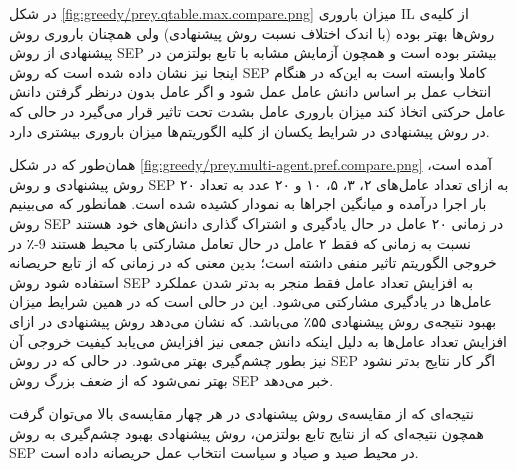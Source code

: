 
در شکل
\ref{fig:greedy/prey.qtable.max.compare.png}
میزان باروری IL از کلیه‌ی روش‌ها بهتر بوده (با اندک اختلاف نسبت روش پیشنهادی) ولی همچنان باروری روش پیشنهادی از روش SEP بیشتر بوده است و همچون آزمایش مشابه با تابع بولتزمن در اینجا نیز نشان داده شده است که روش SEP کاملا وابسته است به این‌که در هنگام انتخاب عمل بر اساس دانش عامل عمل شود و اگر عامل بدون درنظر گرفتن دانش عامل حرکتی اتخاذ کند میزان باروری عامل بشدت تحت تاثیر قرار می‌گیرد در حالی که در روش پیشنهادی در شرایط یکسان از کلیه الگوریتم‌ها میزان باروری بیشتری دارد.


 همان‌طور که در شکل
\ref{fig:greedy/prey.multi-agent.pref.compare.png}
آمده است، روش پیشنهادی و روش SEP به ازای تعداد عامل‌های ۲، ۳، ۵، ۱۰ و ۲۰ عدد به تعداد ۲۰ بار اجرا درآمده و میانگین اجراها به نمودار کشیده شده است. همانطور که می‌بینیم روش SEP در زمانی ۲۰ عامل در حال یادگیری و اشتراک گذاری دانش‌های خود هستند نسبت به زمانی که فقط ۲ عامل در حال تعامل مشارکتی با محیط هستند 9-٪ در خروجی الگوریتم تاثیر منفی داشته است؛ بدین معنی که در زمانی که از تابع حریصانه استفاده شود روش SEP به افزایش تعداد عامل فقط منجر به بدتر شدن عملکرد عامل‌ها در یادگیری مشارکتی می‌شود. این در حالی است که در همین شرایط میزان بهبود نتیجه‌ی روش پیشنهادی ۵۵٪ می‌باشد. که نشان می‌دهد روش پیشنهادی در ازای افزایش تعداد عامل‌ها به دلیل اینکه دانش جمعی نیز افزایش می‌یابد کیفیت خروجی آن نیز بطور چشم‌گیری بهتر می‌شود. در حالی که در روش SEP اگر کار نتایج بدتر نشود بهتر نمی‌شود که از ضعف بزرگ روش SEP خبر می‌دهد.


 نتیجه‌ای که از مقایسه‌ی روش پیشنهادی در هر چهار مقایسه‌ی بالا می‌توان گرفت همچون نتیجه‌ای که از نتایج تابع بولتزمن، روش پیشنهادی بهبود چشم‌گیری به روش SEP در محیط صید و صیاد و سیاست انتخاب عمل حریصانه داده است.
